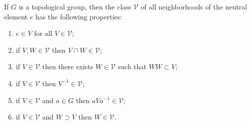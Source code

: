 If $G$ is a topological group, then the class $\mathcal{V}$ of all neighborhoods of the neutral element $e$ has the following properties:
\begin{enumerate}
\item[(1)] $e \in V$ for all $V \in \mathcal{V}$;
\item[(2)] if $V, W \in \mathcal{V}$ then $V \cap W \in \mathcal{V}$;
\item[(3)] if $V \in \mathcal{V}$ then there exists $W \in \mathcal{V}$ such that $WW \subset V$;
\item[(4)] if $V \in \mathcal{V}$ then $V^{-1} \in \mathcal{V}$;
\item[(5)] if $V \in \mathcal{V}$ and $a \in G$ then $aVa^{-1} \in \mathcal{V}$;
\item[(6)] if $V \in \mathcal{V}$ and $W \supset V$ then $W \in \mathcal{V}$.
\end{enumerate}
